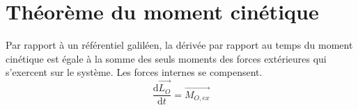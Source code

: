 \documentclass[french]{yLectureNote}
\renewcommand{\vec}{\overrightarrow}
\newcommand{\dd}{\mathrm{d}}
\begin{document}
\section{Théorème du moment cinétique}
\begin{theorem}
Par rapport à un référentiel galiléen, la dérivée par rapport au temps du moment cinétique est égale à la somme des seuls moments des forces extérieures qui s'exercent sur le système. Les forces internes se compensent.
 \[\frac{\dd \vec{L_O}}{\dd t} = \vec{M_{O,ex}}\]
\end{theorem}
\end{document}
